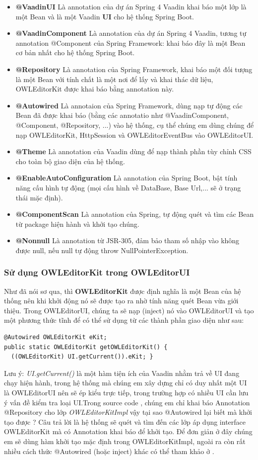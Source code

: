 \begin{itemize}	
\item \textbf{@VaadinUI} Là annotation của dự án Spring 4 Vaadin \cite{spring4vaadin} khai báo một lớp là một Bean và là một Vaadin \textbf{UI} cho hệ thống Spring Boot.
\item \textbf{@VaadinComponent} Là annotation của dự án Spring 4 Vaadin, tương tự annotation @Component của Spring Framework: khai báo đây là một Bean cơ bản nhất cho hệ thống Spring Boot.
\item \textbf{@Repository} Là annotation của Spring Framework, khai báo một đối tượng là một Bean với tính chất là một nơi để lấy và khai thác dữ liệu, OWLEditorKit được khai báo bằng annotation này.
\item \textbf{@Autowired} Là annotaion của Spring Framework, dùng nạp tự động các Bean đã được khai báo (bằng các annotatio như @VaadinComponent, @Component, @Repository, ...) vào hệ thống, cụ thể chúng em dùng chúng để nạp OWLEditorKit, HttpSession và OWLEditorEventBus vào OWLEditorUI.
\item \textbf{@Theme} Là annotation của Vaadin dùng để nạp thành phần tùy chỉnh CSS cho toàn bộ giao diện của hệ thống.
\item \textbf{@EnableAutoConfiguration} Là annotation của Spring Boot, bật tính năng cấu hình tự động (mọi cấu hình về DataBase, Base Url,... sẽ ở trạng thái mặc định).
\item \textbf{@ComponentScan} Là annotation của Spring, tự động quét và tìm các Bean từ package hiện hành và khởi tạo chúng.
\item \textbf{@Nonnull} Là annotation từ JSR-305, đảm bảo tham số nhập vào không được null, nếu null tự động throw NullPointerException.
\end{itemize}
\subsubsection{Sử dụng OWLEditorKit trong OWLEditorUI}
Như đã nói sơ qua, thì \textbf{OWLEditorKit} được định nghĩa là một Bean của hệ thống nên khi khởi động nó sẽ được tạo ra nhờ tính năng quét Bean vừa giới thiệu. Trong OWLEditorUI, chúng ta sẽ nạp (inject) nó vào OWLEditorUI và tạo một phương thức tĩnh để có thể sử dụng từ các thành phần giao diện như sau:
\begin{verbatim}
@Autowired OWLEditorKit eKit; 
public static OWLEditorKit getOWLEditorKit() {
  ((OWLEditorKit) UI.getCurrent()).eKit; }
\end{verbatim}
Lưu ý: \textit{UI.getCurrent()} là một hàm tiện ích của Vaadin nhằm trả về UI đang chạy hiện hành, trong hệ thống mà chúng em xây dựng chỉ có duy nhất một UI là OWLEditorUI nên sẽ ép kiểu trực tiếp, trong trường hợp có nhiều UI cần lưu ý vấn đề kiểm tra loại UI.Trong source code \cite{owleditorSrc}, chúng em chỉ khai báo Annotation @Repository cho lớp \textit{OWLEditorKitImpl} vậy tại sao @Autowired lại biết mà khởi tạo được ? Câu trả lời là hệ thống sẽ quét và tìm đến các lớp áp dụng interface OWLEditorKit mà có Annotation khai báo để khởi tạo. Để đơn giản ở đây chúng em sẽ dùng hàm khởi tạo mặc định trong OWLEditorKitImpl, ngoài ra còn rất nhiều cách thức @Autowired (hoặc inject) khác có thể tham khảo ở \cite{springboot}.
